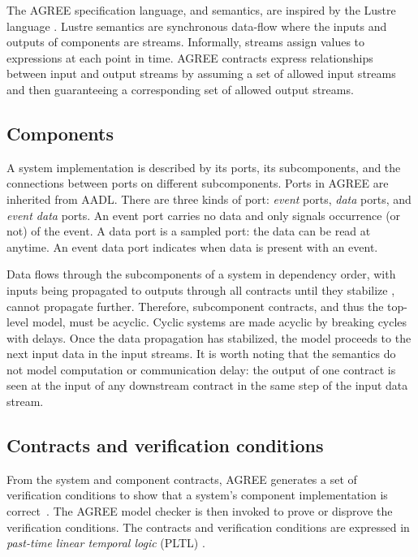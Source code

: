 
\newcommand{\globally}{\konst{Always}}
\newcommand{\historically}{\konst{Hist}}
\newcommand{\assumes}{\ensuremath{A}}
\newcommand{\guarantees}{\ensuremath{P}}
\newcommand{\inputs}{\ensuremath{I}}
\newcommand{\outputs}{\ensuremath{O}}
\newcommand{\components}{\ensuremath{C}}
\newcommand{\component}{\ensuremath{c}}

The AGREE specification language, and semantics, are inspired by the
Lustre language \cite{10.1145/41625.41641}. Lustre semantics are
synchronous data-flow where the inputs and outputs of components are
streams.  Informally, streams assign values to expressions at each
point in time.  AGREE contracts express relationships between input
and output streams by assuming a set of allowed input streams and then
guaranteeing a corresponding set of allowed output streams.

\subsection{Components}
A system implementation is described by its ports, its subcomponents,
and the connections between ports on different subcomponents.  Ports
in AGREE are inherited from AADL.  There are three kinds of port:
\emph{event} ports, \emph{data} ports, and \emph{event data} ports.
An event port carries no data and only signals occurrence (or not) of the
event. A data port is a sampled port: the data can be read at anytime.
An event data port indicates when data is present with an event.

Data flows through the subcomponents of a system in dependency order,
with inputs being propagated to outputs through all contracts until
they stabilize \ie, cannot propagate further. Therefore, subcomponent
contracts, and thus the top-level model, must be acyclic.  Cyclic
systems are made acyclic by breaking cycles with delays.  Once the
data propagation has stabilized, the model proceeds to the next input
data in the input streams. It is worth noting that the semantics do
not model computation or communication delay: the output of one
contract is seen at the input of any downstream contract in the same
step of the input data stream.



\subsection{Contracts and verification conditions}

From the system and component contracts, AGREE generates a set of
verification conditions to show that a system's component
implementation is correct~\cite{agree2013}.  The AGREE model checker
is then invoked to prove or disprove the verification
conditions. The contracts and verification conditions are expressed in
\emph{past-time linear temporal logic} (PLTL) \cite{10.1093/jigpal/8.1.55}.

